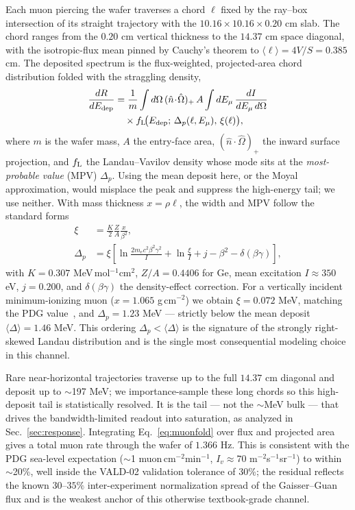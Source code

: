 Each muon piercing the wafer traverses a chord $\ell$ fixed by the
ray--box intersection of its straight trajectory with the
$10.16\times10.16\times0.20$ cm slab. The chord ranges from the $0.20$ cm
vertical thickness to the $14.37$ cm space diagonal, with the
isotropic-flux mean pinned by Cauchy's theorem to
$\langle\ell\rangle=4V/S=0.385$ cm. The deposited spectrum is the
flux-weighted, projected-area chord distribution folded with the
straggling density,
\begin{equation}
\begin{aligned}
\frac{dR}{dE_{\rm dep}}
&= \frac{1}{m}\int d\Omega\,(\hat{n}\!\cdot\!\hat{\Omega})_{+}\,A
\int dE_\mu\,\frac{dI}{dE_\mu\,d\Omega}\\
&\quad\times
f_{\rm L}\!\big(E_{\rm dep};\,\Delta_p(\ell,E_\mu),\,\xi(\ell)\big),
\end{aligned}
\label{eq:muonfold}
\end{equation}
where $m$ is the wafer mass, $A$ the entry-face area,
$(\hat{n}\!\cdot\!\hat{\Omega})_{+}$ the inward surface projection, and
$f_{\rm L}$ the Landau--Vavilov density whose mode sits at the
\emph{most-probable value} (MPV) $\Delta_p$. Using the mean deposit here,
or the Moyal approximation, would misplace the peak and suppress the
high-energy tail; we use neither. With mass thickness $x=\rho\ell$, the
width and MPV follow the standard forms
\begin{equation}
\begin{aligned}
\xi&=\frac{K}{2}\frac{Z}{A}\frac{x}{\beta^2},\\
\Delta_p&=\xi\!\left[\ln\frac{2m_ec^2\beta^2\gamma^2}{I}+\ln\frac{\xi}{I}
+j-\beta^2-\delta(\beta\gamma)\right],
\end{aligned}
\label{eq:landau}
\end{equation}
with $K=0.307$ MeV\,mol$^{-1}$cm$^2$, $Z/A=0.4406$ for Ge, mean
excitation $I\approx350$ eV, $j=0.200$, and $\delta(\beta\gamma)$ the
density-effect correction. For a vertically incident minimum-ionizing
muon ($x=1.065$ g\,cm$^{-2}$) we obtain $\xi=0.072$ MeV, matching the PDG
value~\cite{pdg}, and $\Delta_p=1.23$ MeV --- strictly below the mean
deposit $\langle\Delta\rangle=1.46$ MeV. This ordering
$\Delta_p<\langle\Delta\rangle$ is the signature of the strongly
right-skewed Landau distribution and is the single most consequential
modeling choice in this channel.

Rare near-horizontal trajectories traverse up to the full $14.37$ cm
diagonal and deposit up to $\sim$197 MeV; we importance-sample these long
chords so this high-deposit tail is statistically resolved. It is the
tail --- not the $\sim$MeV bulk --- that drives the bandwidth-limited
readout into saturation, as analyzed in Sec.~\ref{sec:response}.
Integrating Eq.~\eqref{eq:muonfold} over flux and projected area gives a
total muon rate through the wafer of $1.366$ Hz. This is consistent with
the PDG sea-level expectation ($\sim$1 muon\,cm$^{-2}$min$^{-1}$,
$I_v\approx70$ m$^{-2}$s$^{-1}$sr$^{-1}$) to within $\sim$20\%, well
inside the VALD-02 validation tolerance of 30\%; the residual reflects
the known $30$--$35\%$ inter-experiment normalization spread of the
Gaisser--Guan flux and is the weakest anchor of this otherwise
textbook-grade channel.

